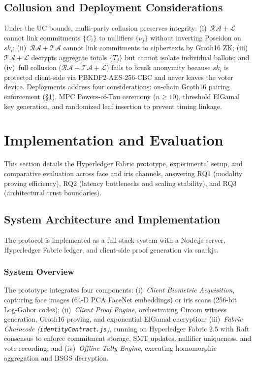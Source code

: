 \documentclass[10pt,letterpaper,journal]{IEEEtran}
\begin{document}
\subsection{Collusion and Deployment Considerations}
\label{sec:collusion}\label{sec:gaps}
Under the UC bounds, multi-party collusion preserves integrity: (i)~$\mathcal{RA} + \mathcal{L}$ cannot link commitments $\{C_i\}$ to nullifiers $\{\nu_j\}$ without inverting Poseidon on $sk_i$; (ii)~$\mathcal{RA} + \mathcal{TA}$ cannot link commitments to ciphertexts by Groth16 ZK; (iii)~$\mathcal{TA} + \mathcal{L}$ decrypts aggregate totals $\{T_j\}$ but cannot isolate individual ballots; and (iv)~full collusion ($\mathcal{RA} + \mathcal{TA} + \mathcal{L}$) fails to break anonymity because $sk_i$ is protected client-side via PBKDF2-AES-256-CBC and never leaves the voter device.
Deployments address four considerations: on-chain Groth16 pairing enforcement (\S\ref{sec:implementation_and_evaluation}), MPC Powers-of-Tau ceremony ($n \ge 10$), threshold ElGamal key generation, and randomized leaf insertion to prevent timing linkage.

\section{Implementation and Evaluation}
\label{sec:implementation_and_evaluation}

This section details the Hyperledger Fabric prototype, experimental setup, and comparative evaluation across face and iris channels, answering RQ1 (modality proving efficiency), RQ2 (latency bottlenecks and scaling stability), and RQ3 (architectural trust boundaries).

\subsection{System Architecture and Implementation}

The protocol is implemented as a full-stack system with a Node.js server, Hyperledger Fabric ledger, and client-side proof generation via snarkjs.

\subsubsection{System Overview}


The prototype integrates four components: (i)~\emph{Client Biometric Acquisition}, capturing face images (64-D PCA FaceNet embeddings) or iris scans (256-bit Log-Gabor codes); (ii)~\emph{Client Proof Engine}, orchestrating Circom witness generation, Groth16 proving, and exponential ElGamal encryption; (iii)~\emph{Fabric Chaincode (\texttt{identityContract.js})}, running on Hyperledger Fabric 2.5 with Raft consensus to enforce commitment storage, SMT updates, nullifier uniqueness, and vote recording; and (iv)~\emph{Offline Tally Engine}, executing homomorphic aggregation and BSGS decryption.
\end{document}
